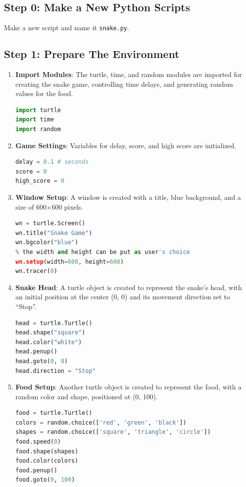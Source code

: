 \subsection{Step 0: Make a New Python Scripts}
Make a new script and name it \texttt{snake.py}.

\subsection{Step 1: Prepare The Environment}

\begin{enumerate}
    \item \textbf{Import Modules}: The turtle, time, and random modules are imported for creating the snake game, controlling time delays, and generating random values for the food.
\begin{lstlisting}[language=Python]
import turtle
import time
import random
\end{lstlisting}
  
  \item \textbf{Game Settings}: Variables for delay, score, and high score are initialized.
\begin{lstlisting}[language=Python]
delay = 0.1 # seconds
score = 0
high_score = 0
\end{lstlisting}
  
  \item \textbf{Window Setup}: A window is created with a title, blue background, and a size of 600×600 pixels.
\begin{lstlisting}[language=Python]
wn = turtle.Screen()
wn.title("Snake Game")
wn.bgcolor("blue")
% the width and height can be put as user's choice
wn.setup(width=600, height=600)
wn.tracer(0)
\end{lstlisting}

  \item \textbf{Snake Head}: A turtle object is created to represent the snake’s head, with an initial position at the center (0, 0) and its movement direction set to “Stop”.
\begin{lstlisting}[language=Python]
head = turtle.Turtle()
head.shape("square")
head.color("white")
head.penup()
head.goto(0, 0)
head.direction = "Stop"
\end{lstlisting}

\clearpage
\item \textbf{Food Setup}: Another turtle object is created to represent the food, with a random color and shape, positioned at (0, 100).
\begin{lstlisting}[language=Python]
food = turtle.Turtle()
colors = random.choice(['red', 'green', 'black'])
shapes = random.choice(['square', 'triangle', 'circle'])
food.speed(0)
food.shape(shapes)
food.color(colors)
food.penup()
food.goto(0, 100)
\end{lstlisting}


\end{enumerate}
